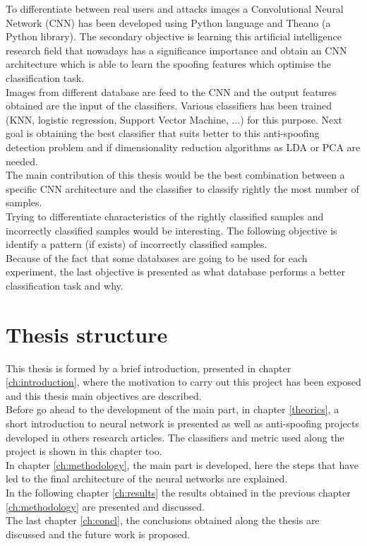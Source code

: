 To differentiate between real users and attacks images a Convolutional Neural Network (CNN) has been developed using Python language and Theano (a Python library). The secondary objective is learning this artificial intelligence research field that nowadays has a significance importance and obtain an CNN architecture which is able to learn the spoofing features which optimise the classification task.\\

Images from different database are feed to the CNN and the output features obtained are the input of the classifiers. Various classifiers has been trained (KNN, logistic regression, Support Vector Machine, ...) for this purpose. Next goal is obtaining the best classifier that suits better to this anti-spoofing detection problem and if dimensionality reduction algorithms as LDA or PCA are needed.\\

The main contribution of this thesis would be the best combination between a specific CNN architecture and the classifier to classify rightly the most number of samples.\\

Trying to differentiate characteristics of the rightly classified samples and incorrectly classified samples would be interesting. The following objective is identify a pattern (if exists) of incorrectly classified samples.\\

Because of the fact that some databases are going to be used for each experiment, the last objective is presented as what database performs a better classification task and why.\\

\section{Thesis structure}
This thesis is formed by a brief introduction, presented in chapter \ref{ch:introduction}, where the motivation to carry out this project has been exposed and this thesis main objectives are described.\\

Before go ahead to the development of the main part, in chapter \ref{theorics}, a short introduction to neural network is presented as well as anti-spoofing projects developed in others research articles. The classifiers and metric used along the project is shown in this chapter too.\\

In chapter \ref{ch:methodology}, the main part is developed, here the steps that have led to the final architecture of the neural networks are explained.\\

In the following chapter \ref{ch:results} the results obtained in the previous chapter \ref{ch:methodology} are presented and discussed.\\

The last chapter \ref{ch:concl}, the conclusions obtained along the thesis are discussed and the future work is proposed.\\
